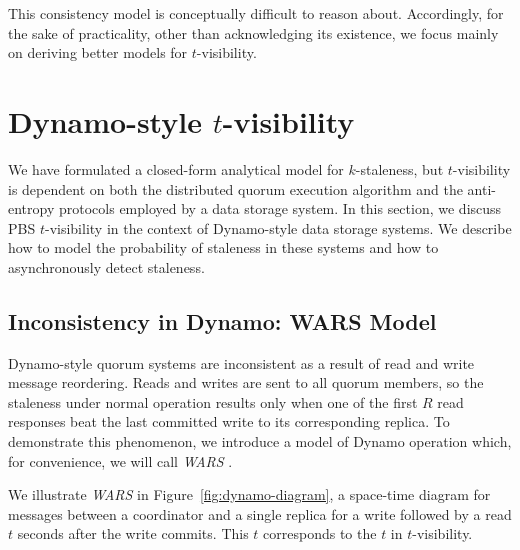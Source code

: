 \documentclass{vldb}
\begin{document}
This consistency model is conceptually difficult to reason about.
Accordingly, for the sake of practicality, other than acknowledging
its existence, we focus mainly on deriving better models for
$t$-visibility.

\section{Dynamo-style $t$-visibility}
\label{sec:dynamo}

We have formulated a closed-form analytical model for $k$-staleness,
but $t$-visibility is dependent on both the distributed quorum
execution algorithm and the anti-entropy protocols employed by a data
storage system.  In this section, we discuss PBS $t$-visibility in the
context of Dynamo-style data storage systems.  We describe how to
model the probability of staleness in these systems and how to
asynchronously detect staleness.

\subsection{Inconsistency in Dynamo: WARS Model}

Dynamo-style quorum systems are inconsistent as a result of read and
write message reordering.  Reads and writes are sent to all quorum
members, so the staleness under normal operation results only when one
of the first $R$ read responses beat the last committed write to its
corresponding replica.  To demonstrate this phenomenon, we introduce a
model of Dynamo operation which, for convenience, we will call \textit{WARS} .

We illustrate \textit{WARS} in Figure~\ref{fig:dynamo-diagram}, a space-time
diagram for messages between a coordinator and a single replica for a
write followed by a read $t$ seconds after the write commits.
This $t$ corresponds to the $t$ in $t$-visibility.
\end{document}

